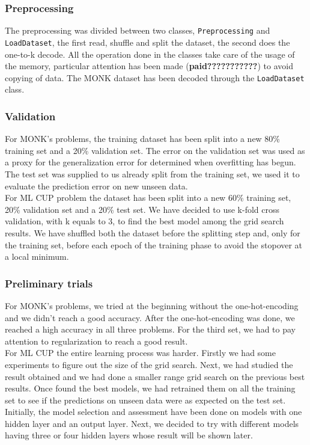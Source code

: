 \subsubsection{Preprocessing}
The preprocessing was divided between two classes, \texttt{Preprocessing} and \texttt{LoadDataset}, the first read, shuffle and split the dataset, the second does the one-to-k decode. All the operation done in the classes take care of the usage of the memory, particular attention has been made (\textbf{paid???????????}) to avoid copying of data. The MONK dataset has been decoded through the \texttt{LoadDataset} class.

\subsubsection{Validation}
For MONK's problems, the training dataset has been split into a new 80\% training set and a 20\% validation set. The error on the validation set was used as a proxy for the generalization error for determined when overfitting has begun. The test set was supplied to us already split from the training set, we used it to evaluate the prediction error on new unseen data. 
\\
For ML CUP problem the dataset has been split into a new 60\% training set, 20\% validation set and a 20\% test set. We have decided to use k-fold cross validation, with k equals to 3, to find the best model among the grid search results. 
We have shuffled both the dataset before the splitting step and, only for the training set, before each epoch of the training phase to avoid the stopover at a local minimum. 


\subsubsection{Preliminary trials}

For MONK's problems, we tried at the beginning without the one-hot-encoding and we didn't reach a good accuracy. After the one-hot-encoding was done, we reached a high accuracy in all three problems. For the third set, we had to pay attention to regularization to reach a good result.
\\
For ML CUP the entire learning process was harder. Firstly we had some experiments to figure out the size of the grid search. Next, we had studied the result obtained and we had done a smaller range grid search on the previous best results. Once found the best models, we had retrained them on all the training set to see if the predictions on unseen data were as expected on the test set. 
\\
Initially, the model selection and assessment have been done on models with one hidden layer and an output layer. Next, we decided to try with different models having three or four hidden layers whose result will be shown later.
